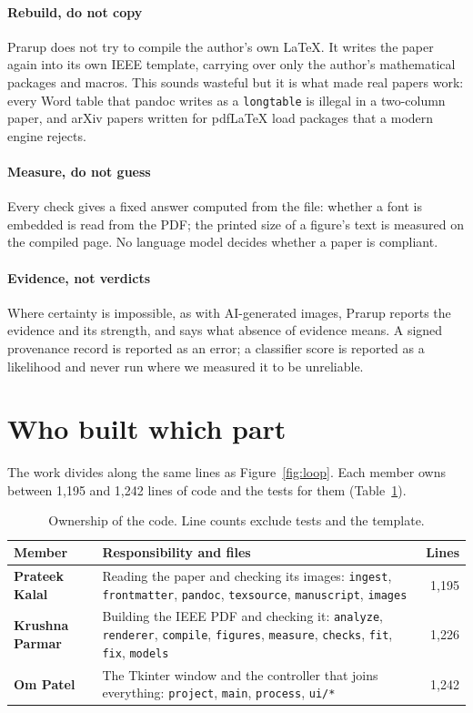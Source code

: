 \documentclass[11pt,a4paper,oneside,openany]{book}
\newcommand{\code}[1]{\texttt{#1}}
\begin{document}
\paragraph{Rebuild, do not copy}
Prarup does not try to compile the author's own \LaTeX{}. It writes the paper again into its own IEEE
template, carrying over only the author's mathematical packages and macros. This sounds wasteful but it is
what made real papers work: every Word table that pandoc writes as a \code{longtable} is illegal in a
two-column paper, and arXiv papers written for pdf\LaTeX{} load packages that a modern engine rejects.

\paragraph{Measure, do not guess}
Every check gives a fixed answer computed from the file: whether a font is embedded is read from the PDF;
the printed size of a figure's text is measured on the compiled page. No language model decides whether a
paper is compliant.

\paragraph{Evidence, not verdicts}
Where certainty is impossible, as with AI-generated images, Prarup reports the evidence and its strength,
and says what absence of evidence means. A signed provenance record is reported as an error; a classifier
score is reported as a likelihood and never run where we measured it to be unreliable.

\section{Who built which part}
The work divides along the same lines as Figure~\ref{fig:loop}. Each member owns between 1{,}195 and
1{,}242 lines of code and the tests for them (Table~\ref{tab:roles}).

\begin{table}[htbp]
\centering\small
\caption{Ownership of the code. Line counts exclude tests and the template.}
\label{tab:roles}
\begin{tabularx}{\linewidth}{>{\bfseries}l X r}
\toprule
Member & Responsibility and files & Lines\\
\midrule
Prateek Kalal & Reading the paper and checking its images: \code{ingest}, \code{frontmatter}, \code{pandoc}, \code{texsource}, \code{manuscript}, \code{images} & 1{,}195\\
Krushna Parmar & Building the IEEE PDF and checking it: \code{analyze}, \code{renderer}, \code{compile}, \code{figures}, \code{measure}, \code{checks}, \code{fit}, \code{fix}, \code{models} & 1{,}226\\
Om Patel & The Tkinter window and the controller that joins everything: \code{project}, \code{main}, \code{process}, \code{ui/*} & 1{,}242\\
\bottomrule
\end{tabularx}
\end{table}
\end{document}
